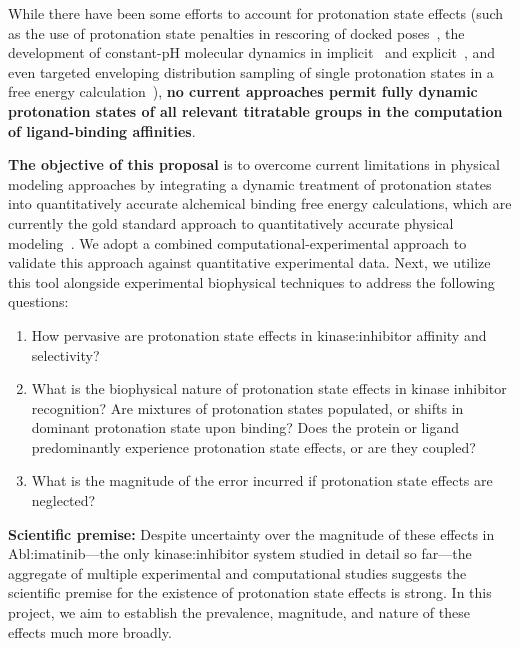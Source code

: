\documentclass[11pt]{article}
\begin{document}
While there have been some efforts to account for protonation state effects (such as the use of protonation state penalties in rescoring of docked poses~\cite{stern:proteins:2010:variable-protonation-state-docking}, the development of constant-pH molecular dynamics in implicit~\cite{mongan:2004:j-comput-chem:constant-pH,brooks:biophys-j:2005:constant-pH-lambda-dynamics} and explicit~\cite{stern:jcp:2007:constant-pH,grubmueller:biophys-j:2011:constant-pH-lambda-dynamics,brooks:proteins:2014:constant-ph-explicit,roux:jctc:2015:constant-pH-ncmc}, and even targeted enveloping distribution sampling of single protonation states in a free energy calculation~\cite{brooks:protein-sci:2016:constant-pH-free-energy}), {\bf no current approaches permit fully dynamic protonation states of all relevant titratable groups in the computation of ligand-binding affinities}.

{\bf The objective of this proposal} is to overcome current limitations in physical modeling approaches by integrating a dynamic treatment of protonation states into quantitatively accurate alchemical binding free energy calculations, which are currently the gold standard approach to quantitatively accurate physical modeling~\cite{chodera:curr-opin-struct-biol:2011:drug-discovery,abel:jacs:2015:fep-plus}.
We adopt a combined computational-experimental approach to validate this approach against quantitative experimental data.
Next, we utilize this tool alongside experimental biophysical techniques to address the following questions:
\begin{enumerate}
  \vspace{-0.15in}
  \item How pervasive are protonation state effects in kinase:inhibitor affinity and selectivity?
  \vspace{-0.1in}
  \item What is the biophysical nature of protonation state effects in kinase inhibitor recognition? Are mixtures of protonation states populated, or shifts in dominant protonation state upon binding? Does the protein or ligand predominantly experience protonation state effects, or are they coupled?
  \vspace{-0.1in}
  \item What is the magnitude of the error incurred if protonation state effects are neglected?
  \vspace{-0.1in}
\end{enumerate}

{\bf Scientific premise:} Despite uncertainty over the magnitude of these effects in Abl:imatinib---the only kinase:inhibitor system studied in detail so far---the aggregate of multiple experimental and computational studies suggests the scientific premise for the existence of protonation state effects is strong.
In this project, we aim to establish the prevalence, magnitude, and nature of these effects much more broadly.
\end{document}
